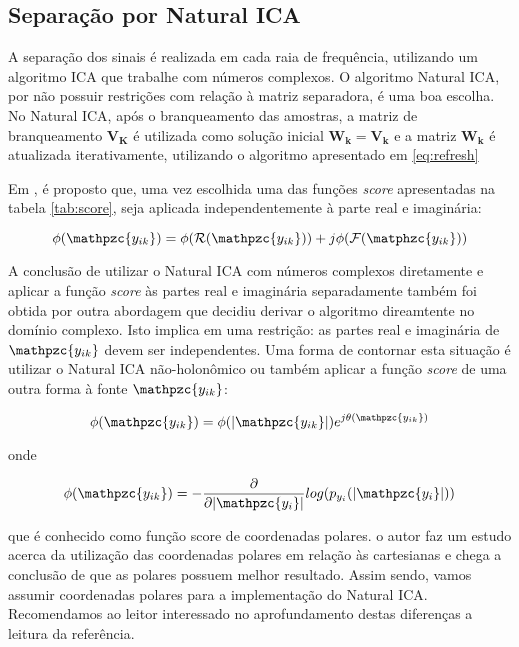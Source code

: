     \subsection{Separação por Natural ICA}
        A separação dos sinais é realizada em cada raia de frequência, utilizando um algoritmo ICA que trabalhe com números complexos. O algoritmo Natural ICA, por não possuir restrições com relação à matriz separadora, é uma boa escolha. No Natural ICA, após o branqueamento das amostras, a matriz de branqueamento $\mathbf{V_K}$ é utilizada como solução inicial $\mathbf{W_k = V_k}$ e a matriz $\mathbf{W_k}$ é atualizada iterativamente, utilizando o algoritmo apresentado em \ref{eq:refresh}
    
        Em \cite{real}, é proposto que, uma vez escolhida uma das funções \textit{score} apresentadas na tabela \ref{tab:score}, seja aplicada independentemente à parte real e imaginária:
        
        \begin{equation}
            \phi(\mathpzc{y_{ik}}) =\phi(\mathcal{R}(\mathpzc{y_{ik}})) + j\phi(\mathcal{F}(\matphzc{y_{ik}}))
        \end{equation}
    
        A conclusão de utilizar o Natural ICA com números complexos diretamente e aplicar a função \textit{score} às partes real e imaginária separadamente também foi obtida por outra abordagem que decidiu derivar o algoritmo direamtente no domínio complexo. Isto implica em uma restrição: as partes real e imaginária de $\mathpzc{y_{ik}}$ devem ser independentes. Uma forma de contornar esta situação é utilizar o Natural ICA não-holonômico ou também aplicar a função \textit{score} de uma outra forma à fonte $\mathpzc{y_{ik}}$:
        
        \begin{equation}
               \phi(\mathpzc{y_{ik}}) =\phi(|\mathpzc{y_{ik}}|)e^{j\theta(\mathpzc{y_{ik}})}
        \end{equation}
        
        onde 
        
        \begin{equation}
            \phi(\mathpzc{y_{ik}}) = - \frac{\partial}{\partial |\mathpzc{y_i}| }log(p_{y_i}(|\mathpzc{y_i}|))
        \end{equation}
        
        que é conhecido como função score de coordenadas polares. o autor \cite{LuizVictorio} faz um estudo acerca da utilização das coordenadas polares em relação às cartesianas e chega a conclusão de que as polares possuem melhor resultado. Assim sendo, vamos assumir coordenadas polares para a implementação do Natural ICA. Recomendamos ao leitor interessado no aprofundamento destas diferenças a leitura da referência.
        
